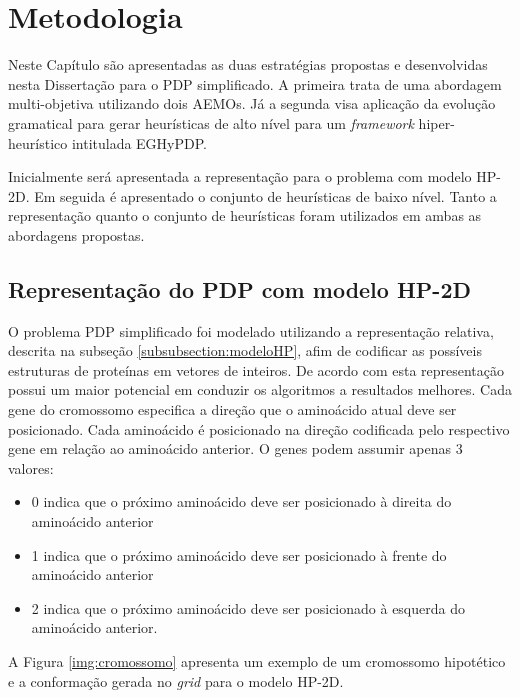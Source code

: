 \chapter{Metodologia}
\label{cap:Metodologia}

Neste Capítulo são apresentadas as duas estratégias propostas e desenvolvidas nesta Dissertação para o PDP simplificado. A primeira trata de uma abordagem multi-objetiva utilizando dois AEMOs. Já a segunda visa aplicação da evolução gramatical  para gerar heurísticas de alto nível para um \textit{framework} hiper-heurístico intitulada EGHyPDP.

Inicialmente será apresentada a representação para o problema com modelo HP-2D. Em seguida é apresentado o conjunto de heurísticas de baixo nível. Tanto a representação quanto o conjunto de heurísticas foram utilizados em ambas as abordagens propostas.

\section{Representação do PDP com modelo HP-2D}

O problema PDP simplificado foi modelado utilizando a representação relativa, descrita na subseção \ref{subsubsection:modeloHP}, afim de codificar as possíveis estruturas de proteínas em vetores de inteiros. De acordo com \cite{krasnogor1999protein} esta representação possui um maior potencial em conduzir os algoritmos a resultados melhores. Cada gene do cromossomo especifica a direção que o aminoácido atual deve ser posicionado. Cada aminoácido é posicionado na direção codificada pelo respectivo gene em relação ao aminoácido anterior. O genes podem assumir apenas 3 valores:

\begin{itemize}
	\item 0 indica que o próximo aminoácido deve ser posicionado à direita do aminoácido anterior
	\item 1 indica que o próximo aminoácido deve ser posicionado à frente do aminoácido anterior
	\item 2 indica que o próximo aminoácido deve ser posicionado à esquerda do aminoácido anterior.
\end{itemize}

A Figura \ref{img:cromossomo} apresenta um exemplo de um cromossomo hipotético e a conformação gerada no \textit{grid} para o modelo HP-2D.


